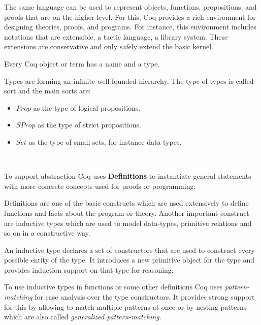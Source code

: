 The same language can be used to represent objects, functions, propositions,
and proofs that are on the higher-level. For this, Coq provides a
rich environment for designing theories, proofs, and programs. For instance,
this environment includes notations that are extensible, a tactic language,
a library system. These extensions are conservative and only safely extend the
basic kernel.~\cite{paulin2011introduction}

\begin{defi}
  Every Coq object or term has a name and a type.
\end{defi}

\begin{defi}
  Types are forming an infinite well-founded hierarchy.
  The type of types is called sort and the main sorts are:
  \begin{itemize}
  \item $Prop$ as the type of logical propositions.
  \item $SProp$ as the type of strict propositions.
  \item $Set$ as the type of small sets, for instance data types.
  \end{itemize}~\cite{the_coq_development_team_2019_2554024}
\end{defi}

\begin{defi}
  To support abstraction Coq uses \textbf{Definitions} to instantiate
  general statements with more concrete concepts used for proofs
  or programming.~\cite{huet1997coq}
\end{defi}

Definitions are one of the basic constructs which are used extensively
to define functions and facts about the program or theory.
Another important construct are inductive types which are used to model
data-types, primitive relations and so on in a constructive way.~\cite{paulin2011introduction}

\begin{defi}
  An inductive type declares a set of constructors that are used
  to construct every possible entity of the type. It introduces
  a new primitive object for the type and provides induction support
  on that type for reasoning.~\cite{paulin2011introduction}
\end{defi}

To use inductive types in functions or some other definitions Coq
uses \textit{pattern-matching} for case analysis over the type
constructors. It provides strong support for this by allowing
to match multiple patterns at once or by nesting patterns which
are also called \textit{generalized
  pattern-matching}.~\cite{paulin2011introduction}

